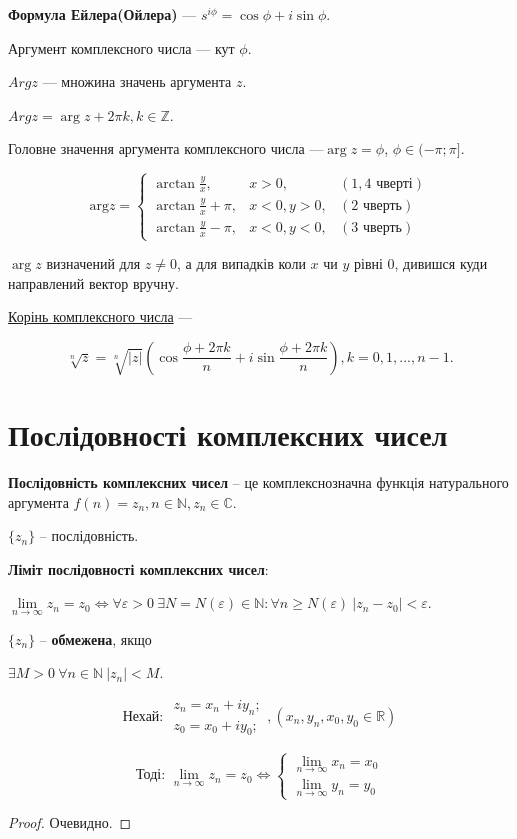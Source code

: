 \textbf{Формула Ейлера(Ойлера)} --- $s^{i \phi} = \cos \phi + i \sin \phi$.

Аргумент комплексного числа --- кут $\phi$.

$Arg z$ --- множина значень аргумента $z$.

$Arg z =  \arg z + 2 \pi k, k \in \mathbb{Z}$.

Головне значення аргумента комплексного числа ---$\arg z =  \phi$, $\phi \in ( - \pi; \pi ]$.

$$\text{arg}z = \left\{ \begin{array}{lcr}
\arctan{\frac{y}{x}},       & x>0,      & (1, 4 \text{ чверті}) \\
\arctan{\frac{y}{x}} + \pi, & x<0, y>0, & (2 \text{ чверть}) \\
\arctan{\frac{y}{x}} - \pi, & x<0, y<0, & (3 \text{ чверть})
\end{array}\right. $$

$\arg z$ визначений для $z \neq 0$, а для випадків коли $x$ чи $y$ рівні 0, дивишся куди направлений вектор вручну.

\underline{Корінь комплексного числа} ---

$$\sqrt[n]{z} = \sqrt[n]{|z|}(\cos\dfrac{\phi+2\pi k}{n} + i\sin\dfrac{\phi+2\pi k}{n}), k=0,1,...,n-1.$$



\section{Послідовності комплексних чисел}

\textbf{Послідовність комплексних чисел} -- це комплекснозначна функція натурального аргумента $f(n) = z_n, n\in\mathbb{N}, z_n\in\mathbb{C}$.

$\{z_n\}$ -- послідовність.

\textbf{Ліміт послідовності комплексних чисел}:

$\lim\limits_{n\rightarrow\infty} z_n = z_0 \Leftrightarrow \forall\varepsilon > 0 ~ \exists N = N ( \varepsilon ) \in\mathbb{N} : \forall n \geqslant N(\varepsilon) ~ |z_n-z_0|<\varepsilon$.

$\{z_n\}$ -- \textbf{обмежена}, якщо 

$\exists M>0 ~ \forall n \in \mathbb{N} ~ |z_n|<M$.

\begin{theorem}
$$
\text{Нехай: } \begin{array}{l}
z_n=x_n+iy_n; \\
z_0=x_0+iy_0;
\end{array}, 
(x_n,y_n,x_0,y_0 \in \mathbb{R})
$$

$$
\text{Тоді: }\lim\limits_{n\rightarrow\infty} z_n = z_0 \Leftrightarrow 
\left\{ \begin{array}{l}
\lim\limits_{n\rightarrow\infty} x_n = x_0 \\
\lim\limits_{n\rightarrow\infty} y_n = y_0
\end{array}\right.
$$
\end{theorem}
\begin{proof}
Очевидно.
\end{proof}

